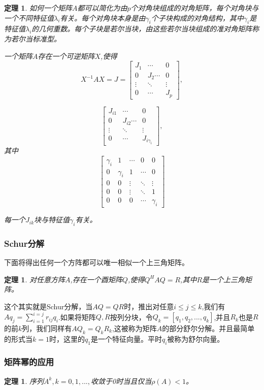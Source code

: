 \documentclass{article}
\begin{document}
\newtheorem{thm}{定理}
\begin{thm}
如何一个矩阵$A$都可以简化为由$p$个对角块组成的对角矩阵，每个对角块与一个不同特征值$\lambda _i$有关。每个对角块本身是由$\gamma _i$个子块构成的对角结构，其中$\gamma _i$是特征值$\lambda _i$的几何重数。每个子块是若尔当块，由这些若尔当块组成的准对角矩阵称为若尔当标准型。

一个矩阵$A$存在一个可逆矩阵$X$,使得
$$X^{-1}AX=J=\begin{bmatrix}
J_1 &\cdots & 0\\
0 &J_2\cdots & 0\\
\vdots & \ddots & \vdots\\
0 & \cdots & J_p
\end{bmatrix},$$

$$\begin{bmatrix}
J_{i1} &\cdots & 0\\
0 &J_{i2}\cdots & 0\\
\vdots & \ddots & \vdots\\
0 & \cdots & J_{i\gamma _i}
\end{bmatrix},$$其中
$$\begin{bmatrix}
\gamma _i &1&\cdots & 0&0\\
0 &\gamma _i&1&\cdots & 0\\
0&0&\vdots & \ddots & \vdots\\
0&0&\vdots & \ddots &1\\
0 &0&0& \cdots & \gamma _i
\end{bmatrix}$$

每一个$J_{ik}$块与特征值$\gamma _i$有关。
\end{thm}
\subsubsection{Schur分解}
下面将得出任何一个方阵都可以唯一相似一个上三角矩阵。

\newtheorem{thm}{定理}
\begin{thm}
对任意方阵$A$,存在一个酉矩阵$Q$,使得$Q^HAQ=R$,其中$R$是一个上三角矩阵。
\end{thm}

这个其实就是Schur分解，当$AQ=QR$时，推出对任意$i\leqslant j\leqslant k$,我们有$Aq_j=\sum_{i=1}^{i=j} r_{ij}q_i$.如果将矩阵$Q,R$按列分块，令$Q_k=[q_1,q_2,...,q_k]$,并且$R_k$也是$R$的前$k$列，我们同样有$AQ_k=Q_kR_k$,这被称为矩阵$A$的部分舒尔分解。并且最简单的形式当$k=1$时，这里的$q_1$是一个特征向量。平时$q_i$被称为舒尔向量。
\subsubsection{矩阵幂的应用}
\newtheorem{thm}{定理}
\begin{thm}
序列$A^k,k=0,1,...,$收敛于0时当且仅当$\rho (A)<1$。
\end{thm}
\end{document}
